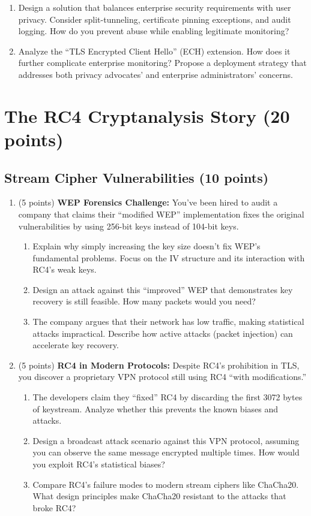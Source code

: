 \documentclass[10pt,a4paper,american]{article}
\begin{document}
\begin{enumerate}
\begin{enumerate}
		      \item Design a solution that balances enterprise security requirements with user privacy. Consider split-tunneling, certificate pinning exceptions, and audit logging. How do you prevent abuse while enabling legitimate monitoring?
		      \item Analyze the ``TLS Encrypted Client Hello'' (ECH) extension. How does it further complicate enterprise monitoring? Propose a deployment strategy that addresses both privacy advocates' and enterprise administrators' concerns.
	      \end{enumerate}
\end{enumerate}

\section{The RC4 Cryptanalysis Story (20 points)}

\subsection{Stream Cipher Vulnerabilities (10 points)}

\begin{enumerate}
	\item (5 points) \textbf{WEP Forensics Challenge:}
	      You've been hired to audit a company that claims their ``modified WEP'' implementation fixes the original vulnerabilities by using 256-bit keys instead of 104-bit keys.
	      \begin{enumerate}
		      \item Explain why simply increasing the key size doesn't fix WEP's fundamental problems. Focus on the IV structure and its interaction with RC4's weak keys.
		      \item Design an attack against this ``improved'' WEP that demonstrates key recovery is still feasible. How many packets would you need?
		      \item The company argues that their network has low traffic, making statistical attacks impractical. Describe how active attacks (packet injection) can accelerate key recovery.
	      \end{enumerate}
	\item (5 points) \textbf{RC4 in Modern Protocols:}
	      Despite RC4's prohibition in TLS, you discover a proprietary VPN protocol still using RC4 ``with modifications.''
	      \begin{enumerate}
		      \item The developers claim they ``fixed'' RC4 by discarding the first 3072 bytes of keystream. Analyze whether this prevents the known biases and attacks.
		      \item Design a broadcast attack scenario against this VPN protocol, assuming you can observe the same message encrypted multiple times. How would you exploit RC4's statistical biases?
		      \item Compare RC4's failure modes to modern stream ciphers like ChaCha20. What design principles make ChaCha20 resistant to the attacks that broke RC4?
	      \end{enumerate}
\end{enumerate}
\end{document}
